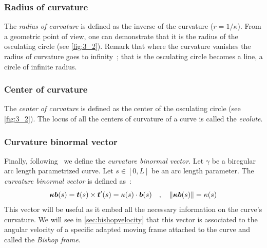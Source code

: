 \subsubsection{Radius of curvature}
The \emph{radius of curvature} is defined as the inverse of the curvature ($r= 1/\kappa$). From a geometric point of view, one can demonstrate that it is the radius of the osculating circle (see \cref{fig:3_2}). Remark that where the curvature vanishes the radius of curvature goes to infinity~; that is the osculating circle becomes a line, a circle of infinite radius.

\subsubsection{Center of curvature}
The \emph{center of curvature} is defined as the center of the osculating circle (see \cref{fig:3_2}). The locus of all the centers of curvature of a curve is called the \emph{evolute}.

\subsubsection{Curvature binormal vector}
\label{sec:kb}
Finally, following~\cite{Bergou2008} we define the \emph{curvature binormal vector}. Let $\gamma$ be a biregular arc length parametrized curve. Let $s\in [0,L]$ be an arc length parameter. The \emph{curvature binormal vector} is defined as~:
\begin{equation}
	\boldsymbol{\kappa b}(s) = \boldsymbol{t}(s) \times \boldsymbol{t}'(s) = \kappa(s)\cdot\boldsymbol{b}(s)
	\quad,\quad
	\lVert\boldsymbol{\kappa b}(s)\rVert= \kappa(s)
\label{eq:kb}
\end{equation}
This vector will be useful as it embed all the necessary information on the curve's curvature. We will see in \cref{sec:bishopvelocity} that this vector is associated to the angular velocity of a specific adapted moving frame attached to the curve and called the \emph{Bishop frame}.

